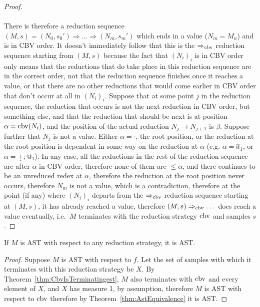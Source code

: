 \begin{proof}
  \paragraph{}
  There is therefore a reduction sequence $(M,s) = (N_0,s_0') \Rightarrow \dots \Rightarrow (N_m, s_m')$ which ends in a value ($N_m = M_n$) and is in CBV order. It doesn't immediately follow that this is the $\Rightarrow_{\operatorname{cbv}}$ reduction sequence starting from $(M,s)$ because the fact that $(N_i)_i$ is in CBV order only means that the reductions that do take place in this reduction sequence are in the correct order, not that the reduction sequence finishes once it reaches a value, or that there are no other reductions that would come earlier in CBV order that don't occur at all in $(N_i)_i$. Suppose that at some point $j$ in the reduction sequence, the reduction that occurs is not the next reduction in CBV order, but something else, and that the reduction that should be next is at position $\alpha = \operatorname{cbv}(N_i)$, and the position of the actual reduction $N_j \to N_{j+1}$ is $\beta$. Suppose further that $N_j$ is not a value. Either $\alpha = \cdot$, the root position, or the reduction at the root position is dependent in some way on the reduction at $\alpha$ (e.g. $\alpha = \textsf{if}_1$, or $\alpha = \underline{+};@_1$). In any case, all the reductions in the rest of the reduction sequence are after $\alpha$ in CBV order, therefore none of them are $\leq \alpha$, and there continues to be an unreduced redex at $\alpha$, therefore the reduction at the root position never occurs, therefore $N_m$ is not a value, which is a contradiction, therefore at the point (if any) where $(N_i)_i$ departs from the $\Rightarrow_{\operatorname{cbv}}$ reduction sequence starting at $(M,s)$, it has already reached a value, therefore $(M,s) \Rightarrow_{\operatorname{cbv}} \dots$ does reach a value eventually, i.e.~$M$ terminates with the reduction strategy $\operatorname{cbv}$ and samples $s$.
\end{proof}

\begin{corollary}
If $M$ is AST with respect to any reduction strategy, it is AST.
\end{corollary}
\begin{proof}
Suppose $M$ is AST with respect to $f$. Let the set of samples with which it terminates with this reduction strategy be $X$. By Theorem~\ref{thm:CbvIsTerminatingest}, $M$ also terminates with $\operatorname{cbv}$ and every element of $X$, and $X$ has measure 1, by assumption, therefore $M$ is AST with respect to $\operatorname{cbv}$ therefore by Theorem~\ref{thm:AstEquivalence} it is AST.
\end{proof}

